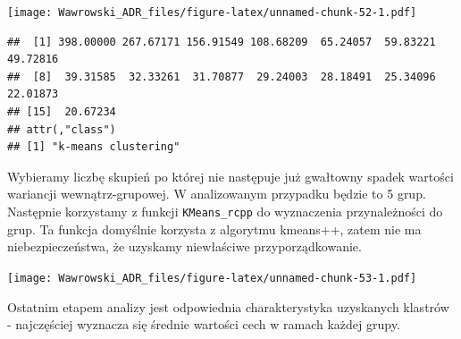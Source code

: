 \documentclass[]{book}
\newenvironment{Shaded}{\begin{snugshade}}{\end{snugshade}}
\newcommand{\DataTypeTok}[1]{\textcolor[rgb]{0.13,0.29,0.53}{#1}}
\newcommand{\DecValTok}[1]{\textcolor[rgb]{0.00,0.00,0.81}{#1}}
\newcommand{\KeywordTok}[1]{\textcolor[rgb]{0.13,0.29,0.53}{\textbf{#1}}}
\newcommand{\NormalTok}[1]{#1}
\newcommand{\OperatorTok}[1]{\textcolor[rgb]{0.81,0.36,0.00}{\textbf{#1}}}
\newcommand{\StringTok}[1]{\textcolor[rgb]{0.31,0.60,0.02}{#1}}
\begin{document}
\texttt{[image: Wawrowski\_ADR\_files/figure-latex/unnamed-chunk-52-1.pdf]}

\begin{verbatim}
##  [1] 398.00000 267.67171 156.91549 108.68209  65.24057  59.83221  49.72816
##  [8]  39.31585  32.33261  31.70877  29.24003  28.18491  25.34096  22.01873
## [15]  20.67234
## attr(,"class")
## [1] "k-means clustering"
\end{verbatim}

Wybieramy liczbę skupień po której nie następuje już gwałtowny spadek wartości wariancji wewnątrz-grupowej. W analizowanym przypadku będzie to 5 grup. Następnie korzystamy z funkcji \texttt{KMeans\_rcpp} do wyznaczenia przynależności do grup. Ta funkcja domyślnie korzysta z algorytmu kmeans++, zatem nie ma niebezpieczeństwa, że uzyskamy niewłaściwe przyporządkowanie.

\begin{Shaded}
\end{Shaded}

\texttt{[image: Wawrowski\_ADR\_files/figure-latex/unnamed-chunk-53-1.pdf]}

Ostatnim etapem analizy jest odpowiednia charakterystyka uzyskanych klastrów - najczęściej wyznacza się średnie wartości cech w ramach każdej grupy.

\begin{Shaded}
\end{Shaded}
\end{document}

